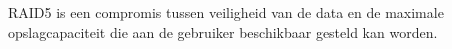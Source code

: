 RAID5 is een compromis tussen veiligheid van de data en de maximale opslagcapaciteit die aan de gebruiker beschikbaar gesteld kan worden.
